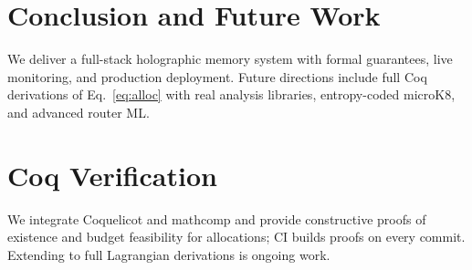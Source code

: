 \documentclass[conference]{IEEEtran}
\begin{document}
\section{Conclusion and Future Work}
We deliver a full-stack holographic memory system with formal guarantees, live monitoring, and production deployment. Future directions include full Coq derivations of Eq.~\eqref{eq:alloc} with real analysis libraries, entropy-coded microK8, and advanced router ML.

\section{Coq Verification}\label{sec:coq}
We integrate Coquelicot and mathcomp and provide constructive proofs of existence and budget feasibility for allocations; CI builds proofs on every commit. Extending to full Lagrangian derivations is ongoing work.



\end{document}
